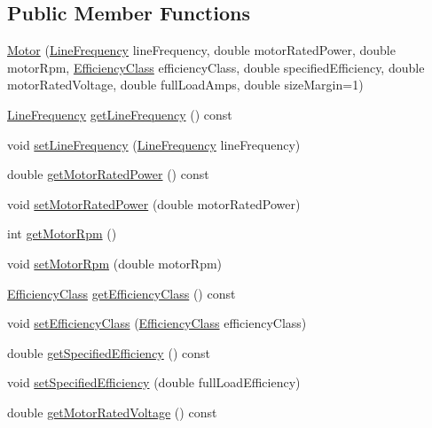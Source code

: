 \subsection*{Public Member Functions}
\begin{DoxyCompactItemize}
\item 
\hyperlink{class_motor_a529cb2685eef1f83ae6a775dd5e50ad9}{Motor} (\hyperlink{class_motor_acee1bdf1b684ad36cb80dc2829d9fcee}{Line\+Frequency} line\+Frequency, double motor\+Rated\+Power, double motor\+Rpm, \hyperlink{class_motor_afa022971ae062406a9f588c601673d4e}{Efficiency\+Class} efficiency\+Class, double specified\+Efficiency, double motor\+Rated\+Voltage, double full\+Load\+Amps, double size\+Margin=1)
\item 
\hyperlink{class_motor_acee1bdf1b684ad36cb80dc2829d9fcee}{Line\+Frequency} \hyperlink{class_motor_a41e71462fe60674a5554e47d0079b0f3}{get\+Line\+Frequency} () const
\item 
void \hyperlink{class_motor_a450e5ecea25b05413b731379f153c3f1}{set\+Line\+Frequency} (\hyperlink{class_motor_acee1bdf1b684ad36cb80dc2829d9fcee}{Line\+Frequency} line\+Frequency)
\item 
double \hyperlink{class_motor_a476d3790492959945b3b75d1638f737f}{get\+Motor\+Rated\+Power} () const
\item 
void \hyperlink{class_motor_aa01f82db13c71b045b05e49f42ba46e9}{set\+Motor\+Rated\+Power} (double motor\+Rated\+Power)
\item 
int \hyperlink{class_motor_a13826c93b894d699478e34a98ffb35ab}{get\+Motor\+Rpm} ()
\item 
void \hyperlink{class_motor_ac0fda674bd40e24bb864e8256fb5ba32}{set\+Motor\+Rpm} (double motor\+Rpm)
\item 
\hyperlink{class_motor_afa022971ae062406a9f588c601673d4e}{Efficiency\+Class} \hyperlink{class_motor_a5d0078bdc164e5ed14334373f183be55}{get\+Efficiency\+Class} () const
\item 
void \hyperlink{class_motor_afa82df266d74ccfed49bf592b5b6526f}{set\+Efficiency\+Class} (\hyperlink{class_motor_afa022971ae062406a9f588c601673d4e}{Efficiency\+Class} efficiency\+Class)
\item 
double \hyperlink{class_motor_aca202d3c2061bd8c19e1819331033e36}{get\+Specified\+Efficiency} () const
\item 
void \hyperlink{class_motor_a0a096ec5fc2b7e8ee40b4e7b30e5f337}{set\+Specified\+Efficiency} (double full\+Load\+Efficiency)
\item 
double \hyperlink{class_motor_a3fedfc960a6970508b39999c58d44cc6}{get\+Motor\+Rated\+Voltage} () const

\end{DoxyCompactItemize}
